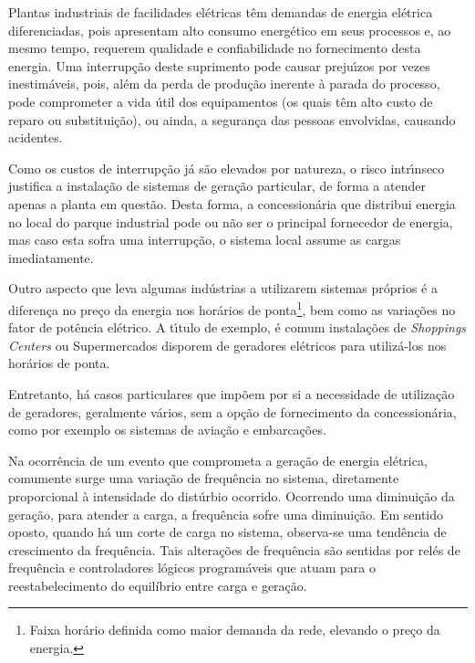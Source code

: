 Plantas industriais de facilidades el{\'e}tricas t{\^e}m demandas de energia el{\'e}trica diferenciadas, pois apresentam alto consumo energ{\'e}tico em seus processos e, ao mesmo tempo, requerem qualidade e confiabilidade no fornecimento desta energia. Uma interrup{\c c}{\~a}o deste suprimento pode causar preju{\'\i}zos por vezes inestim{\'a}veis, pois, al{\'e}m da perda de produ{\c c}{\~a}o inerente {\`a} parada do processo, pode comprometer a vida {\'u}til dos equipamentos (os quais t{\^e}m alto custo de reparo ou substitui{\c c}{\~a}o), ou ainda, a seguran{\c c}a das pessoas envolvidas, causando acidentes.

Como os custos de interrup{\c c}{\~a}o j{\'a} s{\~a}o elevados por natureza, o risco intr{\'\i}nseco justifica a instala{\c c}{\~a}o de sistemas de gera{\c c}{\~a}o particular, de forma a atender apenas a planta em quest{\~a}o. Desta forma, a concession{\'a}ria que distribui energia no local do parque industrial pode ou n{\~a}o ser o principal fornecedor de energia, mas caso esta sofra uma interrup{\c c}{\~a}o, o sistema local assume as cargas imediatamente.

Outro aspecto que leva algumas ind{\'u}strias a utilizarem sistemas pr{\'o}prios {\'e} a diferen{\c c}a no pre{\c c}o da energia nos hor{\'a}rios de ponta\footnote{Faixa hor{\'a}rio definida como maior demanda da rede, elevando o pre{\c c}o da energia.}, bem como as varia{\c c}{\~o}es no fator de pot{\^e}ncia el{\'e}trico. A t{\'\i}tulo de exemplo, {\'e} comum instala{\c c}{\~o}es de \textit{Shoppings Centers} ou Supermercados disporem de geradores el{\'e}tricos para utiliz{\'a}-los nos hor{\'a}rios de ponta.

Entretanto, h{\'a} casos particulares que imp{\~o}em por si a necessidade de utiliza{\c c}{\~a}o de geradores, geralmente v{\'a}rios, sem a op{\c c}{\~a}o de fornecimento da concession{\'a}ria, como por exemplo os sistemas de avia{\c c}{\~a}o e embarca{\c c}{\~o}es.

Na ocorr{\^e}ncia de um evento que comprometa a gera{\c c}{\~a}o de energia el{\'e}trica, comumente surge uma varia{\c c}{\~a}o de frequ{\^e}ncia no sistema, diretamente proporcional {\`a} intensidade do dist{\'u}rbio ocorrido. Ocorrendo uma diminui{\c c}{\~a}o da gera{\c c}{\~a}o, para atender a carga, a frequ{\^e}ncia sofre uma diminui{\c c}{\~a}o. Em sentido oposto, quando h{\'a} um corte de carga no sistema, observa-se uma tend{\^e}ncia de crescimento da frequ{\^e}ncia. Tais altera{\c c}{\~o}es de frequ{\^e}ncia s{\~a}o sentidas por rel{\'e}s de frequ{\^e}ncia \cite{mamede2000proteccao} e controladores l{\'o}gicos program{\'a}veis que atuam para o reestabelecimento do equil{\'i}brio entre carga e gera{\c c}{\~a}o.

